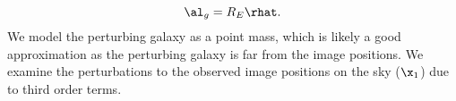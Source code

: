 \begin{equation}
\al_g = R_E \rhat.
\end{equation}
We model the perturbing galaxy as a point mass, which is likely a good approximation as the perturbing galaxy is far from the image positions. We examine the perturbations to the observed image positions on the sky ($\x_1$) due to third order terms.
  
  
